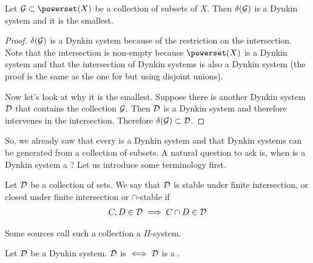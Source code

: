 \begin{thm}
	Let $\calG \subset \powerset(X)$ be a collection of subsets of $X$. Then $\delta(\mathcal{G})$ is a Dynkin system and it is the smallest.
\end{thm}

\begin{proof}
	$\delta(\mathcal{G})$ is a Dynkin system because of the restriction on the intersection. Note that the intersection is non-empty because $\powerset(X)$ is a Dynkin system and that the intersection of Dynkin systems is also a Dynkin system (the proof is the same as the one for \sigas but using disjoint unions).
	
	Now let's look at why it is the smallest. Suppose there is another Dynkin system $\mathcal{D}$ that contains the collection $\mathcal{G}$. Then $\mathcal{D}$ is a Dynkin system and therefore intervenes in the intersection. Therefore $\delta(\mathcal{G}) \subset \mathcal{D}$.
\end{proof}

So, we already saw that every \siga is a Dynkin system and that Dynkin systems can be generated from a collection of subsets. A natural question to ask is, when is a Dynkin system a \siga? Let us introduce some terminology first.


\begin{dfn}
	Let $\mathcal{D}$ be a collection of sets. We say that $\mathcal{D}$ is stable under finite intersection, or closed under finite intersection or $\cap$-stable if
	\begin{align*}
	C, D \in \mathcal{D} \implies C \cap D \in \mathcal{D}
	\end{align*}
	
	Some sources call such a collection a $\Pi$-system.
\end{dfn}

\begin{lem}
	Let $\mathcal{D}$ be a Dynkin system. $\mathcal{D}$ is \istable $\iff \mathcal{D}$ is a \siga.
\end{lem}

